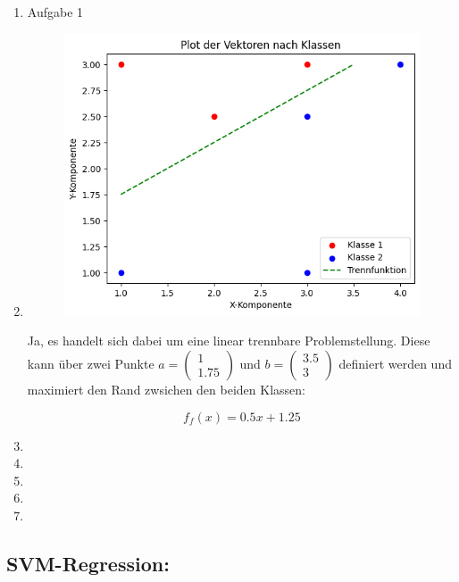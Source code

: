 \documentclass[a4paper,12pt]{article}
\begin{document}
\begin{enumerate}

	\item Aufgabe 1 
	
	\item
		\begin{figure}[H]
			\centering
			\includegraphics[width = .7\linewidth]{aufgabe-4-2.png}
	  	\end{figure}

		Ja, es handelt sich dabei um eine linear trennbare Problemstellung. Diese kann über zwei Punkte 
		$a=\begin{pmatrix} 1 \\ 1.75 \end{pmatrix}$ und $b=\begin{pmatrix} 3.5 \\ 3 \end{pmatrix}$ definiert werden 
		und maximiert den Rand zwsichen den beiden Klassen:

		\[f_f(x)=0.5x+1.25\]
	

	\item
	
	\item
	
	\item
	
	\item
	
	\item


\end{enumerate}


\subsection*{SVM-Regression:}
\end{document}
